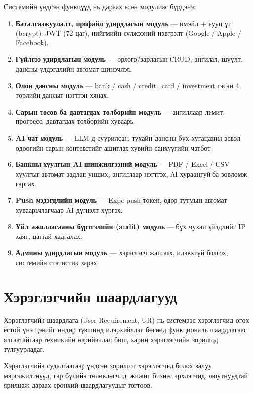 Системийн үндсэн функцүүд нь дараах есөн модулиас бүрдэнэ:
\begin{enumerate}
    \item \textbf{Баталгаажуулалт, профайл удирдлагын модуль} --- имэйл + нууц үг (bcrypt), JWT (72 цаг), нийгмийн сүлжээний нэвтрэлт (Google / Apple / Facebook).
    \item \textbf{Гүйлгээ удирдлагын модуль} --- орлого/зарлагын CRUD, ангилал, шүүлт, дансны үлдэгдлийн автомат шинэчлэл.
    \item \textbf{Олон дансны модуль} --- bank / cash / credit\_card / investment гэсэн 4 төрлийн дансыг нэгтгэн хянах.
    \item \textbf{Сарын төсөв ба давтагдах төлбөрийн модуль} --- ангиллаар лимит, прогресс, давтагдах төлбөрийн хуваарь.
    \item \textbf{AI чат модуль} --- LLM-д суурилсан, тухайн дансны бүх хугацааны эсвэл одоогийн сарын контекстийг ашиглах хувийн санхүүгийн чатбот.
    \item \textbf{Банкны хуулгын AI шинжилгээний модуль} --- PDF / Excel / CSV хуулгыг автомат задлан унших, ангиллаар нэгтгэх, AI хураангуй ба зөвлөмж гаргах.
    \item \textbf{Push мэдэгдлийн модуль} --- Expo push токен, өдөр тутмын автомат хуваарьчлагчаар AI дүгнэлт хүргэх.
    \item \textbf{Үйл ажиллагааны бүртгэлийн (audit) модуль} --- бүх чухал үйлдлийг IP хаяг, цагтай хадгалах.
    \item \textbf{Админы удирдлагын модуль} --- хэрэглэгч жагсаах, идэвхгүй болгох, системийн статистик харах.
\end{enumerate}

\section{Хэрэглэгчийн шаардлагууд}
Хэрэглэгчийн шаардлага (User Requirement, UR) нь системээс хэрэглэгчид өгөх ёстой үнэ цэнийг өндөр түвшинд илэрхийлдэг бөгөөд функциональ шаардлагаас ялгаатайгаар техникийн нарийвчлал биш, харин хэрэглэгчийн зорилгод тулгуурладаг.

Хэрэглэгчийн судалгаагаар үндсэн зорилтот хэрэглэгчид болох залуу мэргэжилтнүүд, гэр бүлийн төлөвлөгчид, жижиг бизнес эрхлэгчид, оюутнуудтай ярилцаж дараах ерөнхий шаардлагуудыг тогтоов.

